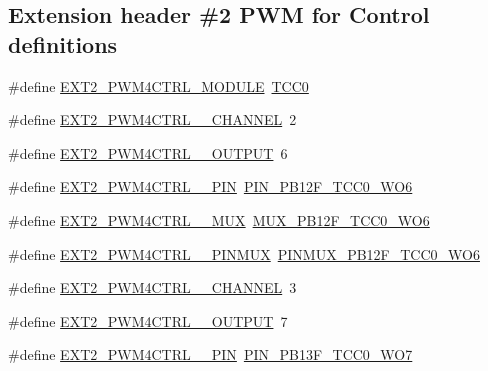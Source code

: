 \subsection*{Extension header \#2 P\+WM for Control definitions}
\begin{DoxyCompactItemize}
\item 
\#define \mbox{\hyperlink{group__samd21__xplained__pro__features__group_ga046aa01afeacdafcf9917b71c316e0ba}{E\+X\+T2\+\_\+\+P\+W\+M4\+C\+T\+R\+L\+\_\+\+M\+O\+D\+U\+LE}}~\mbox{\hyperlink{group___s_a_m_d21_j18_a__base_ga99138b66570ac6a4b370ce5c3b52cd9f}{T\+C\+C0}}
\item 
\#define \mbox{\hyperlink{group__samd21__xplained__pro__features__group_ga355f75349240d25bc5c476c6d4340a91}{E\+X\+T2\+\_\+\+P\+W\+M4\+C\+T\+R\+L\+\_\+\_\+\+C\+H\+A\+N\+N\+EL}}~2
\item 
\#define \mbox{\hyperlink{group__samd21__xplained__pro__features__group_gab8314717b91429e20f7f973cb62fc87d}{E\+X\+T2\+\_\+\+P\+W\+M4\+C\+T\+R\+L\+\_\+\_\+\+O\+U\+T\+P\+UT}}~6
\item 
\#define \mbox{\hyperlink{group__samd21__xplained__pro__features__group_gacc9f763add798cc524c5417330c7e1af}{E\+X\+T2\+\_\+\+P\+W\+M4\+C\+T\+R\+L\+\_\+\_\+\+P\+IN}}~\mbox{\hyperlink{pio_2samd21j18a_8h_a98a8fc88a3034ed58a2a2796279562a3}{P\+I\+N\+\_\+\+P\+B12\+F\+\_\+\+T\+C\+C0\+\_\+\+W\+O6}}
\item 
\#define \mbox{\hyperlink{group__samd21__xplained__pro__features__group_ga16c980fcc52c512e7b631421bd43e2e1}{E\+X\+T2\+\_\+\+P\+W\+M4\+C\+T\+R\+L\+\_\+\_\+\+M\+UX}}~\mbox{\hyperlink{pio_2samd21j18a_8h_ada604ea9095fed0f7437c6773fb57c1e}{M\+U\+X\+\_\+\+P\+B12\+F\+\_\+\+T\+C\+C0\+\_\+\+W\+O6}}
\item 
\#define \mbox{\hyperlink{group__samd21__xplained__pro__features__group_gada19faefbb313e4c75977f15ea54c7f4}{E\+X\+T2\+\_\+\+P\+W\+M4\+C\+T\+R\+L\+\_\+\_\+\+P\+I\+N\+M\+UX}}~\mbox{\hyperlink{pio_2samd21j18a_8h_a7a43c0d167e9c31a7c67b2419bae6496}{P\+I\+N\+M\+U\+X\+\_\+\+P\+B12\+F\+\_\+\+T\+C\+C0\+\_\+\+W\+O6}}
\item 
\#define \mbox{\hyperlink{group__samd21__xplained__pro__features__group_ga31c037aff38c6986f449ec556619c4d6}{E\+X\+T2\+\_\+\+P\+W\+M4\+C\+T\+R\+L\+\_\+\_\+\+C\+H\+A\+N\+N\+EL}}~3
\item 
\#define \mbox{\hyperlink{group__samd21__xplained__pro__features__group_gabb0be79815db253fc1eead6288bacc83}{E\+X\+T2\+\_\+\+P\+W\+M4\+C\+T\+R\+L\+\_\+\_\+\+O\+U\+T\+P\+UT}}~7
\item 
\#define \mbox{\hyperlink{group__samd21__xplained__pro__features__group_ga100a3f3a09262300043d64c72499b879}{E\+X\+T2\+\_\+\+P\+W\+M4\+C\+T\+R\+L\+\_\+\_\+\+P\+IN}}~\mbox{\hyperlink{pio_2samd21j18a_8h_a786bed2bb9fb5cfc59af6f22b448d972}{P\+I\+N\+\_\+\+P\+B13\+F\+\_\+\+T\+C\+C0\+\_\+\+W\+O7}}

\end{DoxyCompactItemize}
